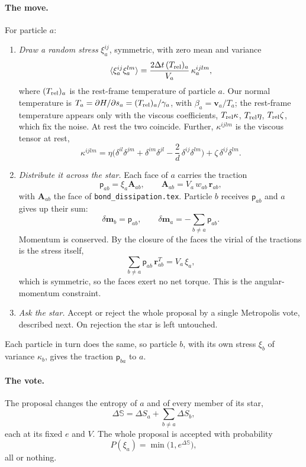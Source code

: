 \documentclass[11pt,aps,preprint,nofootinbib,superscriptaddress,tightenlines]{revtex4-2}
\def\st{\begin{equation}}
\def\stp{\end{equation}}
\newcommand{\pf}{\bm{\mathsf p}}
\newcommand{\avg}[1]{\langle #1\rangle}
\let\oldparagraph\paragraph
\renewcommand{\paragraph}{\par\bigskip\oldparagraph}
\begin{document}
\paragraph{The move.}  For particle $a$:
\begin{enumerate}
\item \emph{Draw a random stress} $\xi_a^{ij}$, symmetric, with zero mean and
  variance
  \st
  \avg{\xi_a^{ij}\xi_a^{lm}}=\frac{2\Delta t\,(T_{\rm rel})_a}{V_a}\,\kappa_a^{ijlm},
  \label{xivar}
  \stp
  where $(T_{\rm rel})_a$ is the rest-frame temperature of particle $a$.  Our
  normal temperature is $T_a=\partial H/\partial s_a=(T_{\rm rel})_a/\gamma_a$, with
  $\beta_a=\bm v_a/T_a$; the rest-frame temperature appears only with the viscous
  coefficients, $T_{\rm rel}\kappa$, $T_{\rm rel}\eta$, $T_{\rm rel}\zeta$, which fix the
  noise.  At rest the two coincide.  Further, $\kappa^{ijlm}$ is the viscous tensor at rest,
  \st
  \kappa^{ijlm}=\eta\Big(\delta^{il}\delta^{jm}+\delta^{im}\delta^{jl}-\frac2d\,\delta^{ij}\delta^{lm}\Big)+\zeta\,\delta^{ij}\delta^{lm}.
  \stp
\item \emph{Distribute it across the star.}  Each face of $a$ carries the
  traction
  \st
  \pf_{ab}=\xi_a\bm A_{ab},\qquad \bm A_{ab}=V_a\,w_{ab}\,\bm r_{ab},
  \label{tstress}
  \stp
  with $\bm A_{ab}$ the face of \texttt{bond\_dissipation.tex}.  Particle $b$
  receives $\pf_{ab}$ and $a$ gives up their sum:
  \st
  \delta\bm m_b=\pf_{ab},\qquad \delta\bm m_a=-\sum_{b\neq a}\pf_{ab}.
  \stp
  Momentum is conserved.  By the closure of the faces the virial of the
  tractions is the stress itself,
  \st
  \sum_{b\neq a}\pf_{ab}\,\bm r_{ab}^T=V_a\,\xi_a ,
  \stp
  which is symmetric, so the faces exert no net torque.  This is the
  angular-momentum constraint.
\item \emph{Ask the star.}  Accept or reject the whole proposal by a single
  Metropolis vote, described next.  On rejection the star is left untouched.
\end{enumerate}
Each particle in turn does the same, so particle $b$, with its own stress
$\xi_b$ of variance $\kappa_b$, gives the traction $\pf_{ba}$ to $a$.

\paragraph{The vote.}  The proposal changes the entropy of $a$ and of every
member of its star,
\st
\Delta\mathbb S=\Delta S_a+\sum_{b\neq a}\Delta S_b ,
\label{dStot}
\stp
each at its fixed $e$ and $V$.  The whole proposal is accepted with probability
\st
P(\xi_a)=\min\big(1,e^{\Delta\mathbb S}\big) ,
\label{Pstar}
\stp
all or nothing.
\end{document}
